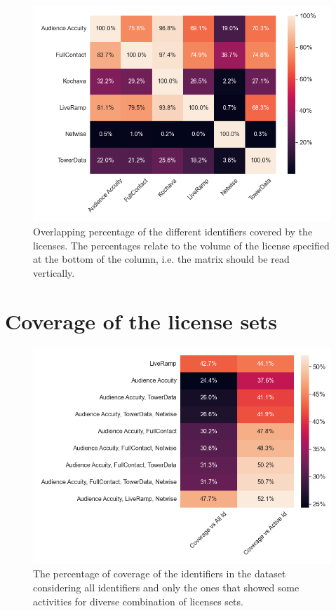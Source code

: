 \documentclass[11pt]{article} %
\begin{document}
\begin{figure}[h!]
  \includegraphics[width=0.8\linewidth]{../outputs/heatmap_percent_overlap.png}
  \caption{Overlapping percentage of the different identifiers covered by the licenses. The percentages relate to the volume of the license specified at the bottom of the column, i.e. the matrix should be read vertically.}
  \label{fig:heatmap_overlap}
\end{figure}

\clearpage
\newpage
\section{Coverage of the license sets}
\begin{figure}[h!]
  \includegraphics[width=0.7\linewidth]{../outputs/heatmap_percent_coverage.png}
  \caption{The percentage of coverage of the identifiers in the dataset considering all identifiers and only the ones that showed some activities for diverse combination of licenses sets.}
  \label{fig:heatmap_percent_coverage}
\end{figure}
\end{document}
